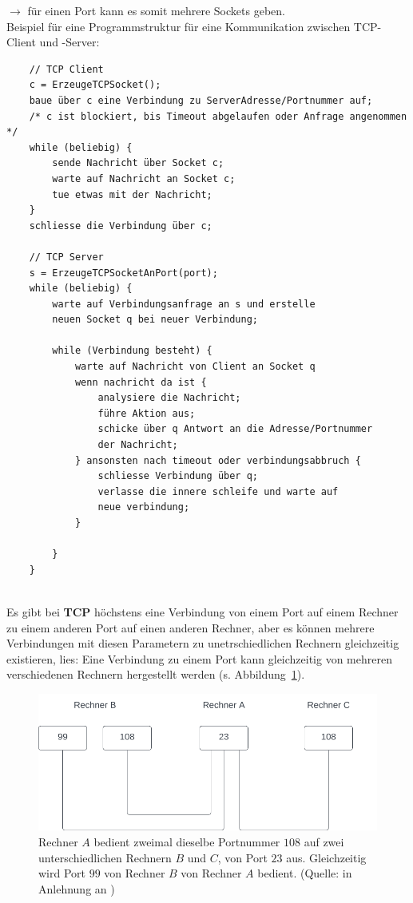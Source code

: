 \noindent
$\rightarrow$ für einen Port kann es somit mehrere Sockets geben.\\


\noindent
Beispiel für eine Programmstruktur für eine Kommunikation zwischen TCP-Client und -Server:
\begin{verbatim}
    // TCP Client
    c = ErzeugeTCPSocket();
    baue über c eine Verbindung zu ServerAdresse/Portnummer auf;
    /* c ist blockiert, bis Timeout abgelaufen oder Anfrage angenommen */
    while (beliebig) {
        sende Nachricht über Socket c;
        warte auf Nachricht an Socket c;
        tue etwas mit der Nachricht;
    }
    schliesse die Verbindung über c;

    // TCP Server
    s = ErzeugeTCPSocketAnPort(port);
    while (beliebig) {
        warte auf Verbindungsanfrage an s und erstelle
        neuen Socket q bei neuer Verbindung;

        while (Verbindung besteht) {
            warte auf Nachricht von Client an Socket q
            wenn nachricht da ist {
                analysiere die Nachricht;
                führe Aktion aus;
                schicke über q Antwort an die Adresse/Portnummer
                der Nachricht;
            } ansonsten nach timeout oder verbindungsabbruch {
                schliesse Verbindung über q;
                verlasse die innere schleife und warte auf
                neue verbindung;
            }

        }
    }
\end{verbatim}\\

\noindent
Es gibt bei \textbf{TCP} höchstens eine Verbindung von einem Port auf einem Rechner zu einem anderen Port auf einen anderen Rechner, aber es können mehrere Verbindungen mit diesen Parametern zu unetrschiedlichen Rechnern gleichzeitig existieren, lies: Eine Verbindung zu einem Port kann gleichzeitig von mehreren verschiedenen Rechnern hergestellt werden (s. Abbildung~\ref{fig:tcpconnections}).


\begin{figure}
    \centering
    \includegraphics[scale=0.5]{chapters/fopt5/img/sockets/tcpconnections}
    \caption[fontsize=\small]{Rechner $A$ bedient zweimal dieselbe Portnummer $108$ auf zwei unterschiedlichen Rechnern $B$ und $C$, von Port $23$ aus. Gleichzeitig wird Port $99$ von Rechner $B$ von Rechner $A$ bedient. (Quelle: in Anlehnung an \cite[265, Bild 5.3]{Oec22})}
    \label{fig:tcpconnections}
\end{figure}


